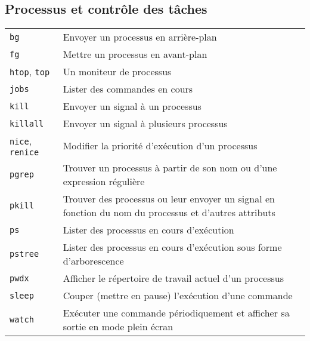 \documentclass[10pt,a4paper]{article}
\begin{document}
\begin{multicols}{2}
\section{Processus et contrôle des tâches}
\begin{tabular}{ p{2.5cm} p{8.5cm} }
  \hline
  \texttt{bg} & Envoyer un processus en arrière-plan \\
  \rowcolor{Gray}
  \texttt{fg} & Mettre un processus en avant-plan \\
  \texttt{htop}, \texttt{top} & Un moniteur de processus \\
  \rowcolor{Gray}
  \texttt{jobs} & Lister des commandes en cours \\
  \texttt{kill} & Envoyer un signal à un processus \\
  \rowcolor{Gray}
  \texttt{killall} & Envoyer un signal à plusieurs processus\\
  \texttt{nice}, \texttt{renice} & Modifier la priorité d'exécution d'un processus \\
  \rowcolor{Gray}
  \texttt{pgrep} & Trouver un processus à partir de son nom ou d'une expression régulière \\
  \texttt{pkill} & Trouver des processus ou leur envoyer un signal en fonction du nom du processus et d'autres attributs\\
  \rowcolor{Gray}
  \texttt{ps} & Lister des processus en cours d'exécution \\
  \texttt{pstree} & Lister des processus en cours d'exécution sous forme d'arborescence \\
  \rowcolor{Gray}
  \texttt{pwdx} & Afficher le répertoire de travail actuel d'un processus \\
  \texttt{sleep} & Couper (mettre en pause) l'exécution d'une commande\\
  \rowcolor{Gray}
  \texttt{watch} & Exécuter une commande périodiquement et afficher sa sortie en mode plein écran \\
  \hline
\end{tabular}


\end{multicols}
\end{document}
